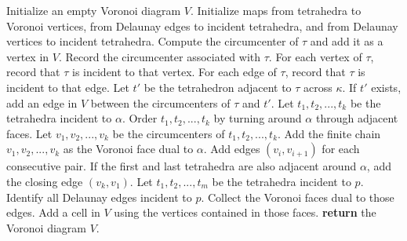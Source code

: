 \documentclass{article}
\begin{document}
\begin{algorithm}
\caption{Computing the Voronoi Diagram from a Delaunay Triangulation \\ \hspace*{1em}\textbf{Input:} A Delaunay triangulation $T$ of a point set $P$ in $\mathbb{R}^3$.\\\hspace*{1em}\textbf{Output:} The Voronoi diagram $V$ of the point set $P$.}
\label{alg:delaunay_to_voronoi}
\begin{algorithmic}[1]
        \State Initialize an empty Voronoi diagram $V$.
        \State Initialize maps from tetrahedra to Voronoi vertices, from Delaunay edges to incident tetrahedra, and from Delaunay vertices to incident tetrahedra.
            \State Compute the circumcenter of $\tau$ and add it as a vertex in $V$.
            \State Record the circumcenter associated with $\tau$.
            \State For each vertex of $\tau$, record that $\tau$ is incident to that vertex.
            \State For each edge of $\tau$, record that $\tau$ is incident to that edge.
        \EndFor
                \State Let $t'$ be the tetrahedron adjacent to $\tau$ across $\kappa$.
                \State If $t'$ exists, add an edge in $V$ between the circumcenters of $\tau$ and $t'$.
            \EndFor
        \EndFor
            \State Let $t_1, t_2, ..., t_k$ be the tetrahedra incident to $\alpha$.
            \State Order $t_1, t_2, ..., t_k$ by turning around $\alpha$ through adjacent faces.
            \State Let $v_1, v_2, ..., v_k$ be the circumcenters of $t_1, t_2, ..., t_k$.
            \State Add the finite chain $v_1, v_2, ..., v_k$ as the Voronoi face dual to $\alpha$.
            \State Add edges $(v_i, v_{i+1})$ for each consecutive pair.
            \State If the first and last tetrahedra are also adjacent around $\alpha$, add the closing edge $(v_k, v_1)$.
        \EndFor
            \State Let $t_1, t_2, ..., t_m$ be the tetrahedra incident to $p$.
            \State Identify all Delaunay edges incident to $p$.
            \State Collect the Voronoi faces dual to those edges.
            \State Add a cell in $V$ using the vertices contained in those faces.
        \EndFor
        \State \textbf{return} the Voronoi diagram $V$.
    \EndProcedure
\end{algorithmic}
\end{algorithm}
\end{document}
